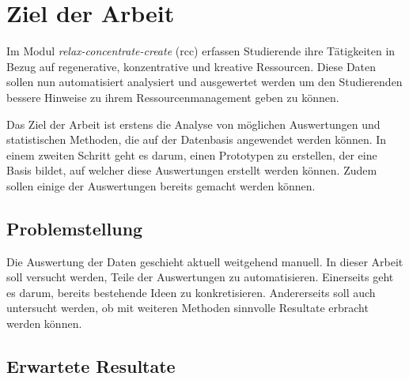 
\section{Ziel der Arbeit}
\label{sec:ziel_der_arbeit}

Im Modul \textit{relax-concentrate-create} (rcc) erfassen Studierende ihre Tätigkeiten in Bezug auf
regenerative, konzentrative und kreative Ressourcen. Diese Daten sollen nun automatisiert analysiert
und ausgewertet werden um den Studierenden bessere Hinweise zu ihrem Ressourcenmanagement geben zu
können. 

Das Ziel der Arbeit ist erstens die Analyse von möglichen Auswertungen und statistischen Methoden,
die auf der Datenbasis angewendet werden können. In einem zweiten Schritt geht es darum, einen
Prototypen zu erstellen, der eine Basis bildet, auf welcher diese Auswertungen erstellt werden
können. Zudem sollen einige der Auswertungen bereits gemacht werden können.

\subsection{Problemstellung}
\label{sub:problemstellung}

Die Auswertung der Daten geschieht aktuell weitgehend manuell. In dieser Arbeit soll versucht
werden, Teile der Auswertungen zu automatisieren. Einerseits geht es darum, bereits bestehende Ideen
zu konkretisieren. Andererseits soll auch untersucht werden, ob mit weiteren Methoden sinnvolle
Resultate erbracht werden können.



\subsection{Erwartete Resultate}
\label{sub:erwartete_resultate}

